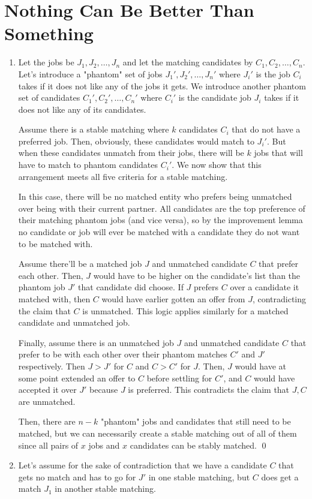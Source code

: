 \documentclass{article}
\begin{document}
\section{Nothing Can Be Better Than Something}
\begin{enumerate}[label=\alph*.]
	\item Let the jobs be $J_1, J_2, \ldots, J_n$ and let the matching  
		candidates by $C_1, C_2, \ldots, C_n$. Let's introduce a "phantom" 
		set of jobs $J_1', J_2', \ldots, J_n'$ where $J_i'$ is the job 
		$C_i$ takes if it does not like any of the jobs it gets. We 
		introduce another phantom set of candidates $C_1', C_2', \ldots, C_n'$ 
		where $C_i'$ is the candidate job $J_i$ takes if it does not like 
		any of its candidates. 

		Assume there is a stable matching where $k$ candidates $C_i$ that do not have a preferred job. 
		Then, obviously, these candidates would 
		match to $J_i'$. But when these candidates unmatch from their jobs, there 
		will be $k$ jobs that will have to match to phantom candidates $C_i'$. 
		We now show that this arrangement meets all five criteria for a stable matching.

		In this case, there will be no matched entity who prefers being unmatched over 
		being with their current partner. All candidates are the top preference of their 
		matching phantom jobs (and vice versa), so by the improvement lemma no candidate 
		or job will ever be matched with a candidate they do not want to be matched with.

		Assume there'll be a matched job $J$ and unmatched candidate $C$ that prefer each 
		other. Then, $J$ would have to be higher on the candidate's list 
		than the phantom job $J'$ that candidate did choose. If $J$ prefers $C$ over a candidate 
		it matched with, then $C$ would have earlier gotten an offer from $J$, 
		contradicting the claim that $C$ is unmatched. This logic applies similarly for a
		matched candidate and unmatched job.

		Finally, assume there is an unmatched job $J$ and unmatched candidate $C$ that prefer to 
		be with each other over their phantom matches $C'$ and $J'$ respectively. 
		Then $J > J'$ for $C$ and $C > C'$ for $J$. Then, $J$ would have at some point 
		extended an offer to $C$ before settling for $C'$, and $C$ would have accepted it 
		over $J'$ because $J$ is preferred. This contradicts the claim that $J, C$ are unmatched.
		
		Then, there are $n-k$ "phantom" 
		jobs and candidates that still 
		need to be matched, but we can 
		necessarily create a stable matching out 
		of all of them since all pairs of $x$ jobs and $x$ candidates can be stably matched. \qed 
	\item Let's assume for the sake of contradiction that we have a candidate
		$C$ that gets no match and has to go for $J'$ in one stable matching,
		but $C$ does get a match $J_1$ in another stable matching. 
	

\end{enumerate}
\end{document}
